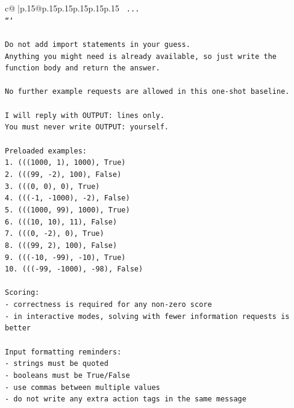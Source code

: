 \documentclass{article}
\begin{document}
{\begin{supertabular}{c@{$\;$}|p{.15\linewidth}@{}p{.15\linewidth}p{.15\linewidth}p{.15\linewidth}p{.15\linewidth}p{.15\linewidth}}
{{{\texttt{    ...} \\
\texttt{```} \\
\\ 
\texttt{Do not add import statements in your guess.} \\
\texttt{Anything you might need is already available, so just write the function body and return the answer.} \\
\\ 
\texttt{No further example requests are allowed in this one{-}shot baseline.} \\
\\ 
\texttt{I will reply with OUTPUT: lines only.} \\
\texttt{You must never write OUTPUT: yourself.} \\
\\ 
\texttt{Preloaded examples:} \\
\texttt{1. (((1000, 1), 1000), True)} \\
\texttt{2. (((99, {-}2), 100), False)} \\
\texttt{3. (((0, 0), 0), True)} \\
\texttt{4. ((({-}1, {-}1000), {-}2), False)} \\
\texttt{5. (((1000, 99), 1000), True)} \\
\texttt{6. (((10, 10), 11), False)} \\
\texttt{7. (((0, {-}2), 0), True)} \\
\texttt{8. (((99, 2), 100), False)} \\
\texttt{9. ((({-}10, {-}99), {-}10), True)} \\
\texttt{10. ((({-}99, {-}1000), {-}98), False)} \\
\\ 
\texttt{Scoring:} \\
\texttt{{-} correctness is required for any non{-}zero score} \\
\texttt{{-} in interactive modes, solving with fewer information requests is better} \\
\\ 
\texttt{Input formatting reminders:} \\
\texttt{{-} strings must be quoted} \\
\texttt{{-} booleans must be True/False} \\
\texttt{{-} use commas between multiple values} \\
\texttt{{-} do not write any extra action tags in the same message} \\
\\ 
}}}
\end{supertabular}}
\end{document}

